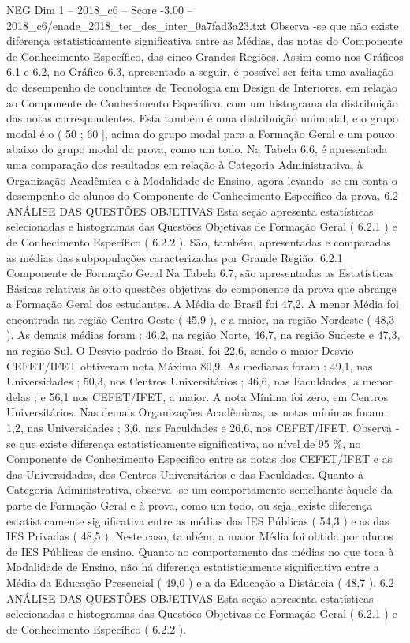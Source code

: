 \begin{textsample}{NEG Dim 1 – 2018\_c6 – Score -3.00 – 2018\_c6/enade\_2018\_tec\_des\_inter\_0a7fad3a23.txt}
Observa -se que não existe diferença estatisticamente significativa entre as Médias, das notas do Componente de Conhecimento Específico, das cinco Grandes Regiões.
Assim como nos Gráficos 6.1 e 6.2, no Gráfico 6.3, apresentado a seguir, é possível ser feita uma avaliação do desempenho de concluintes de Tecnologia em Design de Interiores, em relação ao Componente de Conhecimento Específico, com um histograma da distribuição das notas correspondentes.
Esta também é uma distribuição unimodal, e o grupo modal é o ( 50 ; 60 ], acima do grupo modal para a Formação Geral e um pouco abaixo do grupo modal da prova, como um todo.
Na Tabela 6.6, é apresentada uma comparação dos resultados em relação à Categoria Administrativa, à Organização Acadêmica e à Modalidade de Ensino, agora levando -se em conta o desempenho de alunos do Componente de Conhecimento Específico da prova. 6.2 ANÁLISE DAS QUESTÕES OBJETIVAS Esta seção apresenta estatísticas selecionadas e histogramas das Questões Objetivas de Formação Geral ( 6.2.1 ) e de Conhecimento Específico ( 6.2.2 ).
São, também, apresentadas e comparadas as médias das subpopulações caracterizadas por Grande Região. 6.2.1 Componente de Formação Geral Na Tabela 6.7, são apresentadas as Estatísticas Básicas relativas às oito questões objetivas do componente da prova que abrange a Formação Geral dos estudantes.
A Média do Brasil foi 47,2.
A menor Média foi encontrada na região Centro-Oeste ( 45,9 ), e a maior, na região Nordeste ( 48,3 ).
As demais médias foram : 46,2, na região Norte, 46,7, na região Sudeste e 47,3, na região Sul.
O Desvio padrão do Brasil foi 22,6, sendo o maior Desvio CEFET/IFET obtiveram nota Máxima 80,9.
As medianas foram : 49,1, nas Universidades ; 50,3, nos Centros Universitários ; 46,6, nas Faculdades, a menor delas ; e 56,1 nos CEFET/IFET, a maior.
A nota Mínima foi zero, em Centros Universitários.
Nas demais Organizações Acadêmicas, as notas mínimas foram : 1,2, nas Universidades ; 3,6, nas Faculdades e 26,6, nos CEFET/IFET.
Observa -se que existe diferença estatisticamente significativa, ao nível de 95 \%, no Componente de Conhecimento Específico entre as notas dos CEFET/IFET e as das Universidades, dos Centros Universitários e das Faculdades.
Quanto à Categoria Administrativa, observa -se um comportamento semelhante àquele da parte de Formação Geral e à prova, como um todo, ou seja, existe diferença estatisticamente significativa entre as médias das IES Públicas ( 54,3 ) e as das IES Privadas ( 48,5 ).
Neste caso, também, a maior Média foi obtida por alunos de IES Públicas de ensino.
Quanto ao comportamento das médias no que toca à Modalidade de Ensino, não há diferença estatisticamente significativa entre a Média da Educação Presencial ( 49,0 ) e a da Educação a Distância ( 48,7 ). 6.2 ANÁLISE DAS QUESTÕES OBJETIVAS Esta seção apresenta estatísticas selecionadas e histogramas das Questões Objetivas de Formação Geral ( 6.2.1 ) e de Conhecimento Específico ( 6.2.2 ).

\end{textsample}
